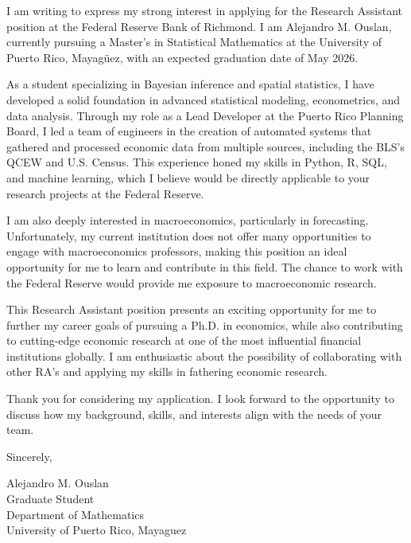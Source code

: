 \documentclass{article}
\begin{document}
I am writing to express my strong interest in applying for the Research Assistant position at the Federal Reserve Bank of Richmond.
I am Alejandro M. Ouslan, currently pursuing a Master’s in Statistical Mathematics at the University of Puerto Rico, Mayagüez, with an expected graduation date of May 2026.

As a student specializing in Bayesian inference and spatial statistics, I have developed a solid foundation in advanced statistical modeling, econometrics, and data analysis.
Through my role as a Lead Developer at the Puerto Rico Planning Board, I led a team of engineers in the creation of automated systems that gathered and processed economic data
from multiple sources, including the BLS’s QCEW and U.S. Census. This experience honed my skills in Python, R, SQL, and machine learning, which I believe would be directly
applicable to your research projects at the Federal Reserve.

I am also deeply interested in macroeconomics, particularly in forecasting. Unfortunately, my current institution does not offer many opportunities to engage with macroeconomics professors,
making this position an ideal opportunity for me to learn and contribute in this field. The chance to work with the Federal Reserve would provide me exposure to macroeconomic
research.

This Research Assistant position presents an exciting opportunity for me to further my career goals of pursuing a Ph.D. in economics, while also contributing to
cutting-edge economic research at one of the most influential financial institutions globally. I am enthusiastic about the possibility of collaborating with
other RA's and applying my skills in fathering economic research.

Thank you for considering my application. I look forward to the opportunity to discuss how my background, skills, and interests align with the needs of your team.

Sincerely,  
\vspace{20pt}  

Alejandro M. Ouslan \\
Graduate Student \\
Department of Mathematics \\
University of Puerto Rico, Mayaguez
\end{document}
